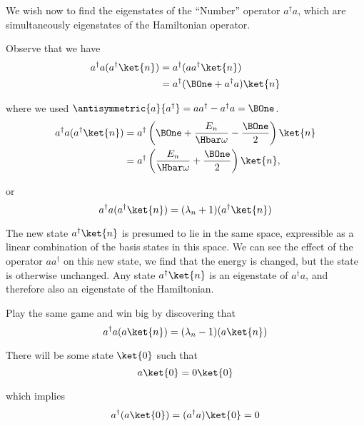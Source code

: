We wish now to find the eigenstates of the ``Number'' operator \(a^\dagger a\), which are simultaneously eigenstates of the Hamiltonian operator.

Observe that we have
%
\begin{equation}\label{eqn:lecture11harmonicOscillator:680}
\begin{aligned}
a^\dagger a (a^\dagger \ket{n} )
&= a^\dagger ( a a^\dagger \ket{n} ) \\
&= a^\dagger ( \BOne + a^\dagger a ) \ket{n}
\end{aligned}
\end{equation}

where we used \(\antisymmetric{a}{a^\dagger} = a a^\dagger - a^\dagger a = \BOne\).
%
\begin{equation}\label{eqn:lecture11harmonicOscillator:700}
\begin{aligned}
a^\dagger a (a^\dagger \ket{n} )
&= a^\dagger \left( \BOne + \frac{E_n}{\Hbar\omega} - \frac{\BOne}{2} \right) \ket{n} \\
&= a^\dagger \left( \frac{E_n}{\Hbar\omega} + \frac{\BOne}{2} \right) \ket{n},
\end{aligned}
\end{equation}

or
\begin{equation}\label{eqn:PHY356FLecture11:100}
a^\dagger a (a^\dagger \ket{n} ) = (\lambda_n + 1) (a^\dagger \ket{n} )
\end{equation}

The new state \(a^\dagger \ket{n}\) is presumed to lie in the same space, expressible as a linear combination of the basis states in this space.  We can see the effect of the operator \(a a^\dagger\) on this new state, we find that the energy is changed, but the state is otherwise unchanged.  Any state \(a^\dagger \ket{n}\) is an eigenstate of \(a^\dagger a\), and therefore also an eigenstate of the Hamiltonian.

Play the same game and win big by discovering that
%
\begin{equation}\label{eqn:PHY356FLecture11:110}
a^\dagger a ( a \ket{n} ) = (\lambda_n -1) (a \ket{n} )
\end{equation}

There will be some state \(\ket{0}\) such that
%
\begin{equation}\label{eqn:PHY356FLecture11:120}
a \ket{0} = 0 \ket{0}
\end{equation}

which implies
\begin{equation}\label{eqn:PHY356FLecture11:130}
a^\dagger (a \ket{0}) = (a^\dagger a) \ket{0} = 0
\end{equation}

